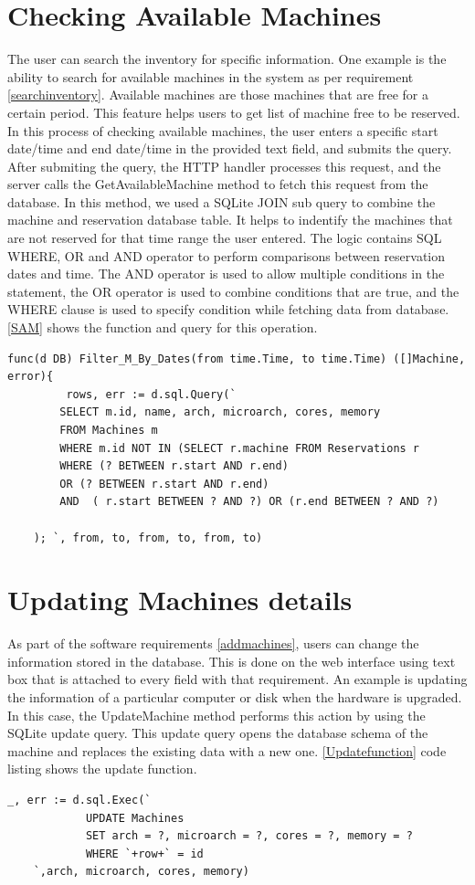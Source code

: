 \section*{Checking Available Machines}
The user can search the inventory for specific information. One example is the ability to search for available machines in the system as per requirement \ref{searchinventory}. Available machines are those machines that are free for a certain period. This feature helps users to get list of machine free to be reserved. In this process of checking available machines, the user enters a specific start date/time and end date/time in the provided text field, and submits the query. After submiting the query, the HTTP handler processes this request, and the server calls the GetAvailableMachine method to fetch this request from the database. In this method, we used a SQLite JOIN sub query to combine the machine and reservation database table. It helps to indentify the machines that are not reserved for that time range the user entered. The logic contains SQL WHERE, OR and AND operator to perform comparisons between reservation dates and time. \cite{ANDOR}The AND operator is used to allow multiple conditions in the statement,  the OR operator is used to combine conditions that are true, and the WHERE clause is used to specify condition while fetching data from database\cite{WHEREclause}. 
\autoref{SAM} shows the function and query for this operation.
\begin{lstlisting}[caption=Searching available, label=SAM]
func(d DB) Filter_M_By_Dates(from time.Time, to time.Time) ([]Machine, error){
         rows, err := d.sql.Query(`
		SELECT m.id, name, arch, microarch, cores, memory
		FROM Machines m
		WHERE m.id NOT IN (SELECT r.machine FROM Reservations r
		WHERE (? BETWEEN r.start AND r.end)
		OR (? BETWEEN r.start AND r.end)
		AND  ( r.start BETWEEN ? AND ?) OR (r.end BETWEEN ? AND ?)
	
	); `, from, to, from, to, from, to)
\end{lstlisting}
\section*{Updating Machines details}
As part of the software requirements \ref{addmachines}, users can change the information stored in the database. This is done on the web interface using text box that is attached to every field with that requirement. An example is updating the information of a particular computer or disk when the hardware is upgraded. In this case, the UpdateMachine method performs this action by using the SQLite update query. This update query opens the database schema of the machine and replaces the existing data with a new one.
\autoref{Updatefunction} code listing shows the update function.
\begin{lstlisting}[caption=Function for Updating data, label=Updatefunction]
	_, err := d.sql.Exec(`
			UPDATE Machines
			SET arch = ?, microarch = ?, cores = ?, memory = ?
			WHERE `+row+` = id
	`,arch, microarch, cores, memory)
\end{lstlisting}
